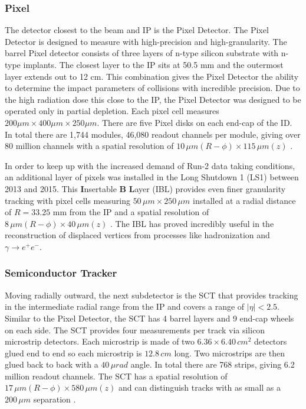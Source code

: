		\subsubsection{Pixel}\label{sssec:pixel}
		The detector closest to the beam and IP is the Pixel Detector. The Pixel Detector is designed to measure with high-precision and high-granularity. The barrel Pixel detector consists of three layers of n-type silicon substrate with n-type implants. The closest layer to the IP sits at 50.5 mm and the outermost layer extends out to 12 cm. This combination gives the Pixel Detector the ability to determine the impact parameters of collisions with incredible precision. Due to the high radiation dose this close to the IP, the Pixel Detector was designed to be operated only in partial depletion. Each pixel cell measures $200 \mu m \times 400 \mu m \times 250 \mu m$. There are five Pixel disks on each end-cap of the ID. In total there are 1,744 modules, 46,080 readout channels per module, giving over 80 million channels with a spatial resolution of $10 \, \mu m (R-\phi) \times 115 \, \mu m (z)$ \cite{ATLAS-pixel}. 

		In order to keep up with the increased demand of Run-2 data taking conditions, an additional layer of pixels was installed in the Long Shutdown 1 (LS1) between 2013 and 2015. This \textbf{I}nsertable \textbf{B} \textbf{L}ayer (IBL) provides even finer granularity tracking with pixel cells measuring $50 \, \mu m \times 250 \, \mu m$ installed at a radial distance of $R=33.25$ mm from the IP and a spatial resolution of $8 \, \mu m (R-\phi) \times 40 \, \mu m (z)$ \cite{ATLAS-IBL}. The IBL has proved incredibly useful in the reconstruction of displaced vertices from processes like \bjet hadronization and $\gamma \rightarrow e^+ e^-$.

		\subsubsection{Semiconductor Tracker}\label{sssec:SCT}
		Moving radially outward, the next subdetector is the SCT that provides tracking in the intermediate radial range from the IP and covers a range of $|\eta| < 2.5$. Similar to the Pixel Detector, the SCT has 4 barrel layers and 9 end-cap wheels on each side. The SCT provides four measurements per track via silicon microstrip detectors. Each microstrip is made of two $6.36 \times 6.40 \, cm^2$ detectors glued end to end so each microstrip is $12.8 \, cm$ long. Two microstrips are then glued back to back with a $40 \, \mu rad$ angle. In total there are 768 strips, giving 6.2 million readout channels. The SCT has a spatial resolution of $17 \, \mu m (R-\phi) \times 580 \,\mu m (z)$ and can distinguish tracks with as small as a $200 \, \mu m$ separation \cite{ATLAS-SCT}.

